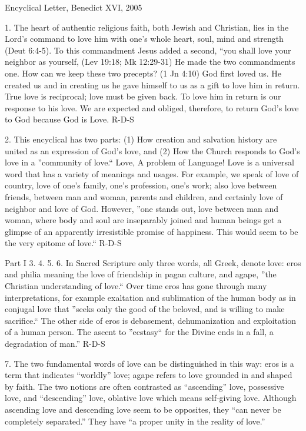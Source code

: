 \documentclass[oneside]{book}
\begin{document}
Encyclical Letter, Benedict XVI, 2005


1. The heart of authentic religious faith, both Jewish and Christian, lies in
the Lord's command to love him with one's whole heart, soul, mind and strength
(Deut 6:4-5). To this commandment Jesus added a second, ``you shall love your
neighbor as yourself, (Lev 19:18; Mk 12:29-31) He made the two commandments
one. How can we keep these two precepts? (1 Jn 4:10) God first loved us. He
created us and in creating us he gave himself to us as a gift to love him in
return. True love is reciprocal; love must be given back. To love him in return
is our response to his love. We are expected and obliged, therefore, to return
God's love to God because God is Love.
R-D-S

2. This encyclical has two parts: (1) How creation and salvation history are
united as an expression of God's love, and (2) How the Church responds to God's
love in a ''community of love.`` Love, A problem of Language! Love is a
universal word that has a variety of meanings and usages. For example, we speak
of love of country, love of one's family, one's profession, one's work; also
love between friends, between man and woman, parents and children, and certainly
love of neighbor and love of God. However, ''one stands out, love between man
and woman, where body and soul are inseparably joined and human beings get a
glimpse of an apparently irresistible promise of happiness. This would seem to
be the very epitome of love.``
R-D-S

Part I
3. 4. 5. 6. In Sacred Scripture only three words, all Greek, denote love: eros
and philia meaning the love of friendship in pagan culture, and agape, ''the
Christian understanding of love.`` Over time eros has gone through many
interpretations, for example exaltation and sublimation of the human body as in
conjugal love that ''seeks only the good of the beloved, and is willing to make
sacrifice.`` The other side of eros is debasement, dehumanization and
exploitation of a human person. The ascent to ''ecstasy`` for the Divine ends in
a fall, a degradation of man.''
R-D-S

7. The two fundamental words of love can be distinguished in this way: eros is a
term that indicates ``worldly'' love; agape refers to love grounded in and
shaped by faith. The two notions are often contrasted as ``ascending'' love,
possessive love, and ``descending'' love, oblative love which means self-giving
love. Although ascending love and descending love seem to be opposites, they
``can never be completely separated.'' They have ``a proper unity in the reality
of love.''
\end{document}
